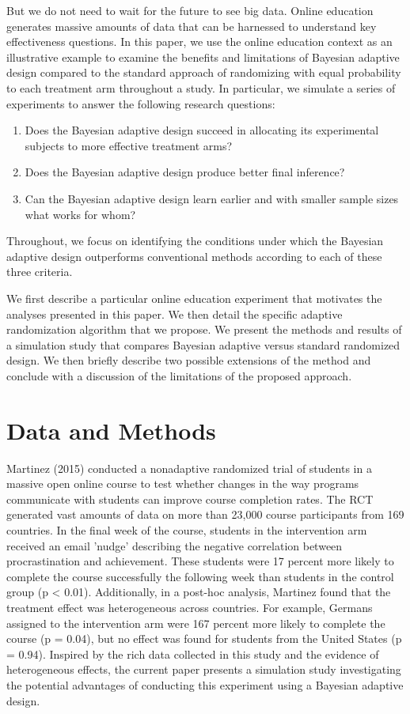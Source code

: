 \documentclass{acm_proc_article-sp}
\begin{document}
But we do not need to wait for the future to see big data. 
Online education generates massive amounts of data that can be harnessed to understand key effectiveness questions. 
In this paper, we use the online education context as an illustrative example to examine the benefits and limitations of Bayesian adaptive design compared to the standard approach of randomizing with equal probability to each treatment arm throughout a study. 
In particular, we simulate a series of experiments to answer the following research questions: 
\begin{enumerate}
  \item	Does the Bayesian adaptive design succeed in allocating its experimental subjects to more effective treatment arms?
  \item	Does the Bayesian adaptive design produce better final inference?
  \item	Can the Bayesian adaptive design learn earlier and with smaller sample sizes what works for whom?
\end{enumerate}

Throughout, we focus on identifying the conditions under which the Bayesian adaptive design outperforms conventional methods according to each of these three criteria.

We first describe a particular online education experiment that motivates the analyses presented in this paper. 
We then detail the specific adaptive randomization algorithm that we propose. We present the methods and results of a simulation study that compares Bayesian adaptive versus standard randomized design. 
We then briefly describe two possible extensions of the method and conclude with a discussion of the limitations of the proposed approach.


\section{Data and Methods}
Martinez (2015) \cite{martinez2014never} conducted a nonadaptive randomized trial of students in a massive open online course to test whether changes in the way programs communicate with students can improve course completion rates. 
The RCT generated vast amounts of data on more than 23,000 course participants from 169 countries.  
In the final week of the course, students in the intervention arm received an email 'nudge' describing the negative correlation between procrastination and achievement. 
These students were 17 percent more likely to complete the course successfully the following week than students in the control group (p < 0.01). 
Additionally, in a post-hoc analysis, Martinez found that the treatment effect was heterogeneous across countries. 
For example, Germans assigned to the intervention arm were 167 percent more likely to complete the course (p = 0.04), but no effect was found for students from the United States (p = 0.94). 
Inspired by the rich data collected in this study and the evidence of heterogeneous effects, the current paper presents a simulation study investigating the potential advantages of conducting this experiment using a Bayesian adaptive design.
\end{document}
